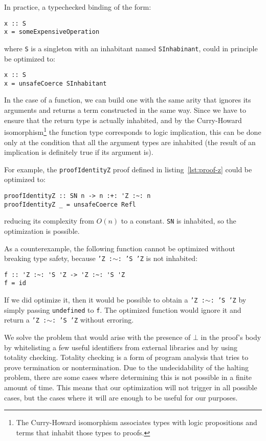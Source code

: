 In practice, a typechecked binding of the form:

\begin{lstlisting}
x :: S
x = someExpensiveOperation
\end{lstlisting}

where \texttt{S} is a singleton with an inhabitant named \texttt{SInhabinant}, could in principle be optimized to:

\begin{lstlisting}
x :: S
x = unsafeCoerce SInhabitant
\end{lstlisting}

In the case of a function, we can build one with the same arity that ignores its arguments and returns a term constructed in the same way.
Since we have to ensure that the return type is actually inhabited, and by the Curry-Howard isomorphism\footnote{The Curry-Howard isomorphism associates types with logic propositions and terms that inhabit those types to proofs.} the function type corresponds to logic implication, this can be done only at the condition that all the argument types are inhabited (the result of an implication is definitely true if its argument is).

For example, the \texttt{proofIdentityZ} proof defined in listing~\ref{lst:proof-z} could be optimized to:

\begin{lstlisting}
proofIdentityZ :: SN n -> n :+: 'Z :~: n
proofIdentityZ _ = unsafeCoerce Refl
\end{lstlisting}

reducing its complexity from $O(n)$ to a constant.
\texttt{SN} is inhabited, so the optimization is possible.

As a counterexample, the following function cannot be optimized without breaking type safety, because \texttt{'Z :$\sim$: 'S 'Z} is not inhabited:

\begin{lstlisting}
f :: 'Z :~: 'S 'Z -> 'Z :~: 'S 'Z
f = id
\end{lstlisting}

If we did optimize it, then it would be possible to obtain a \texttt{'Z :$\sim$: 'S 'Z} by simply passing \texttt{undefined} to \texttt{f}. The optimized function would ignore it and return a \texttt{'Z :$\sim$: 'S 'Z} without erroring.

We solve the problem that would arise with the presence of $\bot$ in the proof's body by whitelisting a few useful identifiers from external libraries and by using totality checking.
Totality checking is a form of program analysis that tries to prove termination or nontermination.
Due to the undecidability of the halting problem, there are some cases where determining this is not possible in a finite amount of time.
This means that our optimization will not trigger in all possible cases, but the cases where it will are enough to be useful for our purposes.

